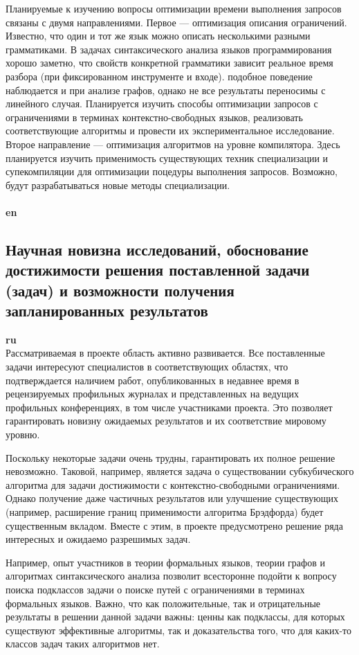 \documentclass[12pt]{article}  %
\theoremstyle{remark}
\begin{document}
Планируемые к изучению вопросы оптимизации времени выполнения запросов связаны с двумя направлениями. Первое --- оптимизация описания ограничений. Известно, что один и тот же язык можно описать несколькими разными грамматиками. В задачах синтаксического анализа языков программирования хорошо заметно, что свойств конкретной грамматики зависит реальное время разбора (при фиксированном инструменте и входе). подобное поведение наблюдается и при анализе графов, однако не все результаты переносимы с линейного случая. Планируется изучить способы оптимизации запросов с ограничениями в терминах контекстно-свободных языков, реализовать соответствующие алгоритмы и провести их экспериментальное исследование. Второе направление --- оптимизация алгоритмов на уровне компилятора. Здесь планируется изучить применимость существующих техник специализации и супекомпиляции для оптимизации поцедуры выполнения запросов. Возможно, будут разрабатываться новые методы специализации.
\\
\\
\textbf{en}\\

\subsection{Научная новизна исследований, обоснование достижимости решения поставленной задачи (задач) и возможности получения запланированных результатов}

\textbf{ru}\\
%
Рассматриваемая в проекте область активно развивается. Все поставленные задачи интересуют специалистов в соответствующих областях, что подтверждается наличием работ, опубликованных в недавнее время в рецензируемых профильных журналах и представленных на ведущих профильных конференциях, в том числе участниками проекта. Это позволяет гарантировать новизну ожидаемых результатов и их соответствие мировому уровню.

Поскольку некоторые задачи очень трудны, гарантировать их полное решение невозможно. Таковой, например, является задача о существовании субкубического алгоритма для задачи достижимости с контекстно-свободными ограничениями. Однако получение даже частичных результатов или улучшение существующих (например, расширение границ применимости алгоритма Брэдфорда) будет существенным вкладом. Вместе с этим, в проекте предусмотрено решение ряда интересных и ожидаемо разрешимых задач.

Например, опыт участников в теории формальных языков, теории графов и алгоритмах синтаксического анализа позволит всесторонне подойти к вопросу поиска подклассов задачи о поиске путей с ограничениями в терминах формальных языков. Важно, что как положительные, так и отрицательные результаты в решении данной задачи важны: ценны как подклассы, для которых существуют эффективные алгоритмы, так и доказательства того, что для каких-то классов задач таких алгоритмов нет.
\end{document}
